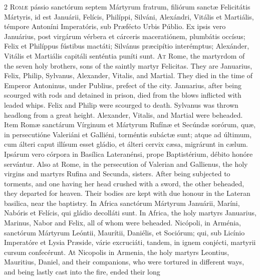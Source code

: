 \begin{paracol}{2}
\lettrine[lines=2]{R}{omæ} pássio sanctórum 
 septem Mártyrum fratrum, filiórum sanctæ Felicitátis Mártyris, id est 
 Januárii, Felícis, Philíppi, Silváni, Alexándri, Vitális et Martiális, 
 témpore Antoníni Imperatóris, sub Præfécto Urbis Públio. Ex ipsis vero 
 Januárius, post virgárum vérbera et cárceris maceratiónem, plumbátis occísus; 
 Felix et Philíppus fústibus mactáti; Silvánus præcipítio interémptus; 
 Alexánder, Vitális et Martiális capitáli senténtia puníti sunt.
\switchcolumn
{}
\lettrine[lines=2]{A}{t} Rome, the martyrdom of the seven 
 holy brothers, sons of the saintly martyr Felicitas. They are 
 Januarius, Felix, Philip, Sylvanus, Alexander, Vitalis, and Martial. 
 They died in the time of Emperor Antoninus, under Publius, prefect of the 
 city. Januarius, after being scourged with rods and detained in 
 prison, died from the blows inflicted with leaded whips. Felix and 
 Philip were scourged to death. Sylvanus was thrown headlong from a 
 great height. Alexander, Vitalis, and Martial were beheaded.
\switchcolumn*
{}
Item Romæ sanctárum 
 Vírginum et Mártyrum Rufínæ et Secúndæ sorórum, quæ, in persecutióne 
 Valeriáni et Galliéni, torméntis subáctæ sunt; atque ad últimum, cum álteri 
 caput illísum esset gládio, et álteri cervix cæsa, migrárunt in cælum. 
 Ipsárum vero córpora in Basílica Lateranénsi, prope Baptistérium, débito 
 honóre servántur.
\switchcolumn
{}
Also at Rome, in the persecution of 
 Valerian and Gallienus, the holy virgins and martyrs Rufina and Secunda, 
 sisters. After being subjected to torments, and one having her head 
 crushed with a sword, the other beheaded, they departed for heaven. 
 Their bodies are kept with due honour in the Lateran basilica, near the baptistry.
\switchcolumn*
{}
In Africa sanctórum 
 Mártyrum Januárii, Maríni, Nabóris et Felícis, qui gládio decolláti sunt.
\switchcolumn
{}
In Africa, the holy martyrs 
 Januarius, Marinus, Nabor and Felix, all of whom were beheaded.
\switchcolumn*
{}
Nicópoli, in Arménia, sanctórum Mártyrum Leóntii, Maurítii, Daniélis, et Sociórum; qui, sub 
 Licínio Imperatóre et Lysia Præside, várie excruciáti, tandem, in ignem 
 conjécti, martyrii cursum confecérunt.
\switchcolumn
{}
At Nicopolis in Armenia, the holy 
 martyrs Leontius, Mauritius, Daniel, and their companions, who were tortured 
 in different ways, and being lastly cast into the fire, ended their long 

\end{paracol}
